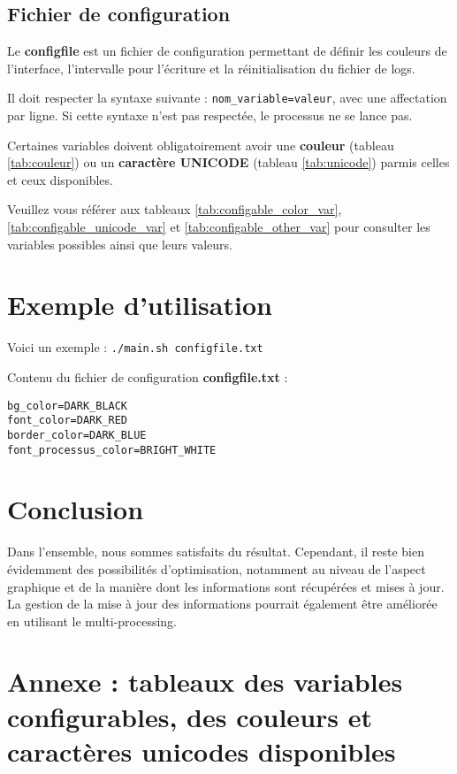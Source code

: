 \documentclass{article}
\begin{document}
\subsection{Fichier de configuration}
Le \textbf{configfile} est un fichier de configuration permettant de définir les couleurs de l'interface, l'intervalle pour l'écriture et la réinitialisation du fichier de logs.
  
Il doit respecter la syntaxe suivante : \texttt{nom\_variable=valeur}, avec une affectation par ligne. Si cette syntaxe n'est pas respectée, le processus ne se lance pas.
\vspace{1em}

Certaines variables doivent obligatoirement avoir une \textbf{couleur} (tableau \ref{tab:couleur}) ou un \textbf{caractère UNICODE} (tableau \ref{tab:unicode}) parmis celles et ceux disponibles.
  
Veuillez vous référer aux tableaux \ref{tab:configable_color_var}, \ref{tab:configable_unicode_var} et \ref{tab:configable_other_var} pour consulter les variables possibles ainsi que leurs valeurs.

\section{Exemple d'utilisation}
Voici un exemple : \texttt{./main.sh configfile.txt}
  
\vspace{0.5em}
Contenu du fichier de configuration \textbf{configfile.txt} :
\begin{verbatim}
bg_color=DARK_BLACK
font_color=DARK_RED
border_color=DARK_BLUE
font_processus_color=BRIGHT_WHITE
\end{verbatim}


\section{Conclusion}
Dans l'ensemble, nous sommes satisfaits du résultat. Cependant, il reste bien évidemment des possibilités d'optimisation, notamment au niveau de l'aspect graphique
 et de la manière dont les informations sont récupérées et mises à jour. La gestion de la mise à jour des informations pourrait également être améliorée en utilisant le multi-processing.

\newpage
\section{Annexe : tableaux des variables configurables, des couleurs et caractères unicodes disponibles}
\end{document}
